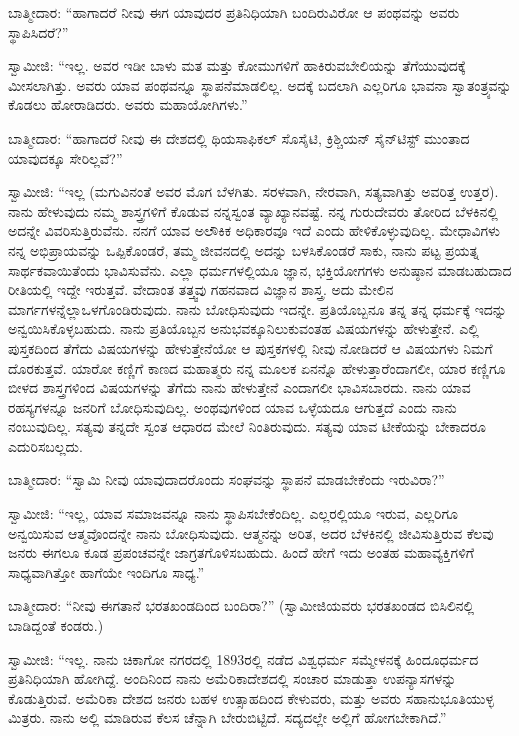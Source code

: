 ಬಾತ್ಮೀದಾರ: “ಹಾಗಾದರೆ ನೀವು ಈಗ ಯಾವುದರ ಪ್ರತಿನಿಧಿಯಾಗಿ ಬಂದಿರುವಿರೋ ಆ ಪಂಥವನ್ನು ಅವರು ಸ್ಥಾಪಿಸಿದರೆ?”

ಸ್ವಾಮೀಜಿ: “ಇಲ್ಲ. ಅವರ ಇಡೀ ಬಾಳು ಮತ ಮತ್ತು ಕೋಮುಗಳಿಗೆ ಹಾಕಿರುವ\break ಬೇಲಿಯನ್ನು ತೆಗೆಯುವುದಕ್ಕೆ ಮೀಸಲಾಗಿತ್ತು. ಅವರು ಯಾವ ಪಂಥವನ್ನೂ ಸ್ಥಾಪನೆ\break ಮಾಡಲಿಲ್ಲ. ಅದಕ್ಕೆ ಬದಲಾಗಿ ಎಲ್ಲರಿಗೂ ಭಾವನಾ ಸ್ವಾತಂತ್ರ್ಯವನ್ನು ಕೊಡಲು ಹೋರಾಡಿದರು. ಅವರು ಮಹಾಯೋಗಿಗಳು.”

ಬಾತ್ಮೀದಾರ: “ಹಾಗಾದರೆ ನೀವು ಈ ದೇಶದಲ್ಲಿ ಥಿಯಸಾಫಿಕಲ್​ ಸೊಸೈಟಿ, ಕ್ರಿಶ್ಚಿಯನ್​ ಸೈನ್​ಟಿಸ್ಟ್​ ಮುಂತಾದ ಯಾವುದಕ್ಕೂ ಸೇರಿಲ್ಲವೆ?”

ಸ್ವಾಮೀಜಿ: “ಇಲ್ಲ (ಮಗುವಿನಂತೆ ಅವರ ಮೊಗ ಬೆಳಗಿತು. ಸರಳವಾಗಿ, ನೇರವಾಗಿ, ಸತ್ಯವಾಗಿತ್ತು ಅವರಿತ್ತ ಉತ್ತರ). ನಾನು ಹೇಳುವುದು ನಮ್ಮ ಶಾಸ್ತ್ರಗಳಿಗೆ ಕೊಡುವ ನನ್ನ\break ಸ್ವಂತ ವ್ಯಾಖ್ಯಾನವಷ್ಟೆ. ನನ್ನ ಗುರುದೇವರು ತೋರಿದ ಬೆಳಕಿನಲ್ಲಿ ಅದನ್ನೇ ವಿವರಿಸುತ್ತಿರುವೆನು. ನನಗೆ ಯಾವ ಅಲೌಕಿಕ ಅಧಿಕಾರವೂ ಇದೆ ಎಂದು ಹೇಳಿಕೊಳ್ಳುವುದಿಲ್ಲ. ಮೇಧಾವಿಗಳು ನನ್ನ ಅಭಿಪ್ರಾಯವನ್ನು ಒಪ್ಪಿಕೊಂಡರೆ, ತಮ್ಮ ಜೀವನದಲ್ಲಿ ಅದನ್ನು ಬಳಸಿಕೊಂಡರೆ ಸಾಕು, ನಾನು ಪಟ್ಟ ಪ್ರಯತ್ನ ಸಾರ್ಥಕವಾಯಿತೆಂದು ಭಾವಿಸುವೆನು. ಎಲ್ಲಾ ಧರ್ಮಗಳಲ್ಲಿಯೂ ಜ್ಞಾನ, ಭಕ್ತಿಯೋಗಗಳು ಅನುಷ್ಠಾನ ಮಾಡಬಹುದಾದ ರೀತಿಯಲ್ಲಿ ಇದ್ದೇ ಇರುತ್ತವೆ. ವೇದಾಂತ ತತ್ತ್ವವು ಗಹನವಾದ ವಿಜ್ಞಾನ ಶಾಸ್ತ್ರ. ಅದು ಮೇಲಿನ ಮಾರ್ಗಗಳನ್ನೆಲ್ಲಾ\break ಒಳಗೊಂಡಿರುವುದು. ನಾನು ಬೋಧಿಸುವುದು ಇದನ್ನೇ. ಪ್ರತಿಯೊಬ್ಬನೂ ತನ್ನ ತನ್ನ ಧರ್ಮಕ್ಕೆ ಇದನ್ನು ಅನ್ವಯಿಸಿಕೊಳ್ಳಬಹುದು. ನಾನು ಪ್ರತಿಯೊಬ್ಬನ ಅನುಭವಕ್ಕೂ\break ನಿಲುಕುವಂತಹ ವಿಷಯಗಳನ್ನು ಹೇಳುತ್ತೇನೆ. ಎಲ್ಲಿ ಪುಸ್ತಕದಿಂದ ತೆಗೆದು ವಿಷಯಗಳನ್ನು ಹೇಳುತ್ತೇನೆಯೋ ಆ ಪುಸ್ತಕಗಳಲ್ಲಿ ನೀವು ನೋಡಿದರೆ ಆ ವಿಷಯಗಳು ನಿಮಗೆ ದೊರಕುತ್ತವೆ. ಯಾರೋ ಕಣ್ಣಿಗೆ ಕಾಣದ ಮಹಾತ್ಮರು ನನ್ನ ಮೂಲಕ ಏನನ್ನೊ ಹೇಳುತ್ತಾರೆಂದಾಗಲೀ, ಯಾರ ಕಣ್ಣಿಗೂ ಬೀಳದ ಶಾಸ್ತ್ರಗಳಿಂದ ವಿಷಯಗಳನ್ನು ತೆಗೆದು ನಾನು ಹೇಳುತ್ತೇನೆ ಎಂದಾಗಲೀ ಭಾವಿಸಬಾರದು. ನಾನು ಯಾವ ರಹಸ್ಯಗಳನ್ನೂ ಜನರಿಗೆ ಬೋಧಿಸುವುದಿಲ್ಲ. ಅಂಥವುಗಳಿಂದ ಯಾವ ಒಳ್ಳೆಯದೂ ಆಗುತ್ತದೆ ಎಂದು ನಾನು ನಂಬುವುದಿಲ್ಲ. ಸತ್ಯವು ತನ್ನದೇ ಸ್ವಂತ ಆಧಾರದ ಮೇಲೆ ನಿಂತಿರುವುದು. ಸತ್ಯವು ಯಾವ ಟೀಕೆಯನ್ನು ಬೇಕಾದರೂ ಎದುರಿಸಬಲ್ಲದು.

ಬಾತ್ಮೀದಾರ: “ಸ್ವಾಮಿ ನೀವು ಯಾವುದಾದರೊಂದು ಸಂಘವನ್ನು ಸ್ಥಾಪನೆ ಮಾಡಬೇಕೆಂದು ಇರುವಿರಾ?”

ಸ್ವಾಮೀಜಿ: “ಇಲ್ಲ, ಯಾವ ಸಮಾಜವನ್ನೂ ನಾನು ಸ್ಥಾಪಿಸಬೇಕೆಂದಿಲ್ಲ. ಎಲ್ಲರಲ್ಲಿಯೂ ಇರುವ, ಎಲ್ಲರಿಗೂ ಅನ್ವಯಿಸುವ ಆತ್ಮವೊಂದನ್ನೇ ನಾನು ಬೋಧಿಸುವುದು. ಆತ್ಮನನ್ನು ಅರಿತ, ಅದರ ಬೆಳಕಿನಲ್ಲಿ ಜೀವಿಸುತ್ತಿರುವ ಕೆಲವು ಜನರು ಈಗಲೂ ಕೂಡ ಪ್ರಪಂಚವನ್ನೇ ಜಾಗ್ರತಗೊಳಿಸಬಹುದು. ಹಿಂದೆ ಹೇಗೆ ಇದು ಅಂತಹ ಮಹಾವ್ಯಕ್ತಿಗಳಿಗೆ ಸಾಧ್ಯವಾಗಿತ್ತೋ ಹಾಗೆಯೇ ಇಂದಿಗೂ ಸಾಧ್ಯ.”

ಬಾತ್ಮೀದಾರ: “ನೀವು ಈಗತಾನೆ ಭರತಖಂಡದಿಂದ ಬಂದಿರಾ?” (ಸ್ವಾಮೀಜಿಯವರು ಭರತಖಂಡದ ಬಿಸಿಲಿನಲ್ಲಿ ಬಾಡಿದ್ದಂತೆ ಕಂಡರು.)

ಸ್ವಾಮೀಜಿ: “ಇಲ್ಲ. ನಾನು ಚಿಕಾಗೋ ನಗರದಲ್ಲಿ 1893ರಲ್ಲಿ ನಡೆದ ವಿಶ್ವಧರ್ಮ ಸಮ್ಮೇಳನಕ್ಕೆ ಹಿಂದೂಧರ್ಮದ ಪ್ರತಿನಿಧಿಯಾಗಿ ಹೋಗಿದ್ದೆ. ಅಂದಿನಿಂದ ನಾನು ಅಮೆರಿಕಾ\break ದೇಶದಲ್ಲಿ ಸಂಚಾರ ಮಾಡುತ್ತಾ ಉಪನ್ಯಾಸಗಳನ್ನು ಕೊಡುತ್ತಿರುವೆ. ಅಮೆರಿಕಾ ದೇಶದ ಜನರು ಬಹಳ ಉತ್ಸಾಹದಿಂದ ಕೇಳುವರು, ಮತ್ತು ಅವರು ಸಹಾನುಭೂತಿಯುಳ್ಳ ಮಿತ್ರರು. ನಾನು ಅಲ್ಲಿ ಮಾಡಿರುವ ಕೆಲಸ ಚೆನ್ನಾಗಿ ಬೇರುಬಿಟ್ಟಿದೆ. ಸದ್ಯದಲ್ಲೇ ಅಲ್ಲಿಗೆ ಹೋಗಬೇಕಾಗಿದೆ.”


